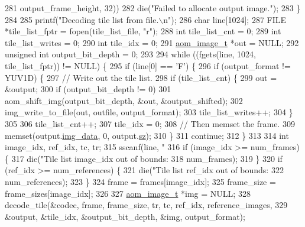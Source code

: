 \begin{DoxyCodeInclude}
{{{{{{{281                        output\_frame\_height, 32))
282       die(\textcolor{stringliteral}{"Failed to allocate output image."});
283   \}
284 
285   printf(\textcolor{stringliteral}{"Decoding tile list from file.\(\backslash\)n"});
286   \textcolor{keywordtype}{char} line[1024];
287   FILE *tile\_list\_fptr = fopen(tile\_list\_file, \textcolor{stringliteral}{"r"});
288   \textcolor{keywordtype}{int} tile\_list\_cnt = 0;
289   \textcolor{keywordtype}{int} tile\_list\_writes = 0;
290   \textcolor{keywordtype}{int} tile\_idx = 0;
291   \hyperlink{structaom__image}{aom\_image\_t} *out = NULL;
292   \textcolor{keywordtype}{unsigned} \textcolor{keywordtype}{int} output\_bit\_depth = 0;
293 
294   \textcolor{keywordflow}{while} ((fgets(line, 1024, tile\_list\_fptr)) != NULL) \{
295     \textcolor{keywordflow}{if} (line[0] == \textcolor{charliteral}{'F'}) \{
296       \textcolor{keywordflow}{if} (output\_format != YUV1D) \{
297         \textcolor{comment}{// Write out the tile list.}
298         \textcolor{keywordflow}{if} (tile\_list\_cnt) \{
299           out = &output;
300           \textcolor{keywordflow}{if} (output\_bit\_depth != 0)
301             aom\_shift\_img(output\_bit\_depth, &out, &output\_shifted);
302           img\_write\_to\_file(out, outfile, output\_format);
303           tile\_list\_writes++;
304         \}
305 
306         tile\_list\_cnt++;
307         tile\_idx = 0;
308         \textcolor{comment}{// Then memset the frame.}
309         memset(output.\hyperlink{structaom__image_a7c367f3227d5876ce9e5c198a01c2028}{img\_data}, 0, output.\hyperlink{structaom__image_af0f6c220bf000d1c488075c19d889290}{sz});
310       \}
311       \textcolor{keywordflow}{continue};
312     \}
313 
314     \textcolor{keywordtype}{int} image\_idx, ref\_idx, tc, tr;
315     sscanf(line, \textcolor{stringliteral}{"%
316     \textcolor{keywordflow}{if} (image\_idx >= num\_frames) \{
317       die(\textcolor{stringliteral}{"Tile list image\_idx out of bounds: %
318           num\_frames);
319     \}
320     \textcolor{keywordflow}{if} (ref\_idx >= num\_references) \{
321       die(\textcolor{stringliteral}{"Tile list ref\_idx out of bounds: %
322           num\_references);
323     \}
324     frame = frames[image\_idx];
325     frame\_size = frame\_sizes[image\_idx];
326 
327     \hyperlink{structaom__image}{aom\_image\_t} *img = NULL;
328     decode\_tile(&codec, frame, frame\_size, tr, tc, ref\_idx, reference\_images,
329                 &output, &tile\_idx, &output\_bit\_depth, &img, output\_format);
}}}}}}}}}}
\end{DoxyCodeInclude}
